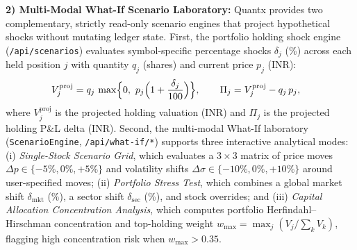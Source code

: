 \documentclass[12pt]{article}
\begin{document}
\textbf{2) Multi-Modal What-If Scenario Laboratory:} Quantx provides two complementary, strictly read-only scenario engines that project hypothetical shocks without mutating ledger state. First, the portfolio holding shock engine (\texttt{/api/scenarios}) evaluates symbol-specific percentage shocks $\delta_j$ (\%) across each held position $j$ with quantity $q_j$ (shares) and current price $p_j$ (INR):
\begin{equation}
\begin{aligned}
V^{\mathrm{proj}}_j &= q_j\,\max\Bigl\{0,\ p_j\Bigl(1+\frac{\delta_j}{100}\Bigr)\Bigr\},\qquad
\Pi_j = V^{\mathrm{proj}}_j - q_j\,p_j,
\end{aligned}
\label{eq:whatif}
\end{equation}
where $V^{\mathrm{proj}}_j$ is the projected holding valuation (INR) and $\Pi_j$ is the projected holding P\&L delta (INR). Second, the multi-modal What-If laboratory (\texttt{ScenarioEngine}, \texttt{/api/what-if/*}) supports three interactive analytical modes: (i) \emph{Single-Stock Scenario Grid}, which evaluates a $3\times 3$ matrix of price moves $\Delta p \in \{-5\%, 0\%, +5\%\}$ and volatility shifts $\Delta \sigma \in \{-10\%, 0\%, +10\%\}$ around user-specified moves; (ii) \emph{Portfolio Stress Test}, which combines a global market shift $\delta_{\mathrm{mkt}}$ (\%), a sector shift $\delta_{\mathrm{sec}}$ (\%), and stock overrides; and (iii) \emph{Capital Allocation Concentration Analysis}, which computes portfolio Herfindahl--Hirschman concentration and top-holding weight $w_{\max} = \max_j (V_j / \sum_k V_k)$, flagging high concentration risk when $w_{\max} > 0.35$.
\end{document}

